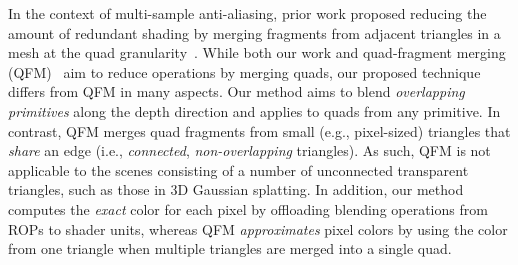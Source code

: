 %
In the context of multi-sample anti-aliasing, prior work proposed reducing the
amount of redundant shading by merging fragments from adjacent triangles in a
mesh at the quad granularity~\cite{fat:bou10}.
%
While both our work and quad-fragment merging (QFM)~\cite{fat:bou10} aim to
reduce operations by merging quads, our proposed technique differs from QFM in
many aspects.
%
Our method aims to blend \emph{overlapping primitives} along the depth
direction and applies to quads from any primitive. In contrast, QFM merges quad
fragments from small (e.g., pixel-sized) triangles that \emph{share} an edge
(i.e., \emph{connected}, \emph{non-overlapping} triangles).
%
As such, QFM is not applicable to the scenes consisting of a number of
unconnected transparent triangles, such as those in 3D Gaussian splatting.
%
In addition, our method computes the \emph{exact} color for each pixel by
offloading blending operations from ROPs to shader units, whereas QFM
\emph{approximates} pixel colors by using the color from one triangle when
multiple triangles are merged into a single quad.

